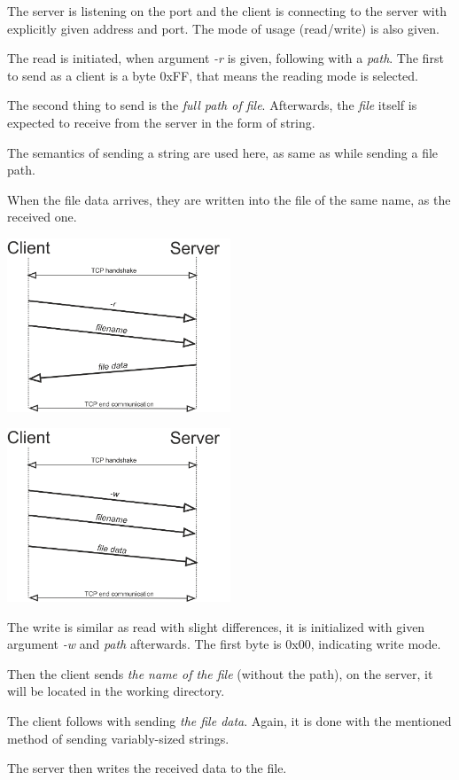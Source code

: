 \documentclass[10pt,a4paper,titlepage]{article}
\begin{document}
The server is listening on the port and the client is connecting
to the server with explicitly given address and port. The mode
of usage (read/write) is also given.


\begin{multicols}{2}
The read is initiated, when argument {\it -r} is given, following with
a {\it path}. The first to send as a client is a byte 0xFF, that means
the reading mode is selected.

The second thing to send is the {\it full path of file}. Afterwards, the {\it file}
itself is expected to receive from the server in the form of string.

The semantics of sending a string are used here, as same as while sending
a file path.

When the file data arrives, they are written into the file of the same name,
as the received one.

\includegraphics[width=0.5\textwidth]{read.png}
\end{multicols}


\begin{multicols}{2}
\includegraphics[width=0.5\textwidth]{write.png}

The write is similar as read with slight differences, it is initialized
with given argument {\it -w} and {\it path} afterwards. The first byte
is 0x00, indicating write mode.

Then the client sends {\it the name of the file} (without the path), on the
server, it will be located in the working directory.

The client follows with sending {\it the file data}. Again, it is done
with the mentioned method of sending variably-sized strings.

The server then writes the received data to the file.

\end{multicols}
\end{document}
